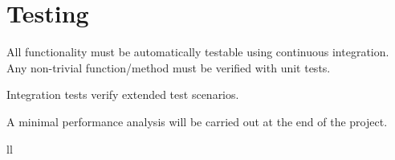 \section{Testing}
All functionality must be automatically testable using continuous integration. Any non-trivial function/method must be verified with unit tests.

Integration tests verify extended test scenarios.

A minimal performance analysis will be carried out at the end of the project.



\label{lastpage} %

\backmatter
{}






\listoffigures %

\listoftables %


\begin{abbreviations}{ll} %


\end{abbreviations}


